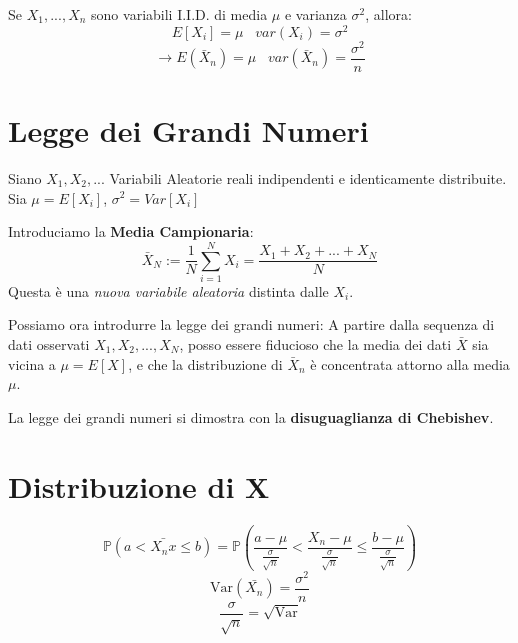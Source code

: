 Se $X_1,...,X_n$ sono variabili I.I.D. di media $\mu$ e varianza $\sigma^2$, allora:
\[ E[X_i] = \mu \;\;\; var(X_i) = \sigma^2 \]
\[ \to E(\bar{X}_n) = \mu  \;\;\; var(\bar{X}_n) = \frac{\sigma^2}{n} \]


\section{Legge dei Grandi Numeri}
Siano $X_1,X_2,...$ Variabili Aleatorie reali indipendenti e identicamente distribuite.
\\Sia $\mu = E[X_i]$, $\sigma^2 = Var[X_i]$

Introduciamo la \textbf{Media Campionaria}:
\[ \bar{X}_N  := \frac{1}{N} \sum_{i=1}^N X_i = \frac{X_1+X_2+ ... + X_N}{N}\]
Questa è una \emph{nuova variabile aleatoria} distinta dalle $X_i$.

Possiamo ora introdurre la legge dei grandi numeri:
A partire dalla sequenza di dati osservati $X_1,X_2,...,X_N$, posso essere fiducioso che la media dei dati
$\bar{X}$ sia vicina a $\mu = E[X]$, e che la distribuzione di $\bar{X}_n$ è concentrata attorno alla media $\mu$.


La legge dei grandi numeri si dimostra con la \textbf{disuguaglianza di Chebishev}.

\section{Distribuzione di X}
\begin{equation*}
    \mathbb{P} (a  < \bar{X_nx} \leq b) = \mathbb{P} (\frac{a - \mu}{\frac{\sigma}{\sqrt{n}}} 
    < \frac{X_n - \mu}{\frac{\sigma}{\sqrt{n}}} \leq \frac{b - \mu}{\frac{\sigma}{\sqrt{n}}})   
\end{equation*}
\begin{equation*}
    \text{Var}(\bar{X_n}) = \frac{\sigma ^ 2}{n} 
\end{equation*}
\begin{equation*}
    \frac{\sigma}{\sqrt{n}} = \sqrt{\text{Var}}
\end{equation*}



